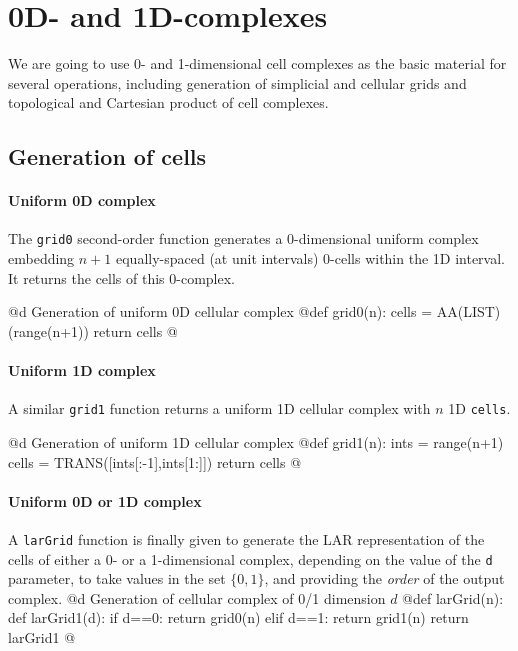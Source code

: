 \documentclass[11pt,oneside]{article}	%
\begin{document}
\section{0D- and 1D-complexes}
\label{sec:0-1-complexes}

We are going to use 0- and 1-dimensional cell complexes as the basic material for several operations, including generation of simplicial and cellular grids and topological and Cartesian product of cell complexes. 


\subsection{Generation of cells}

\paragraph{Uniform 0D complex}
The \texttt{grid0} second-order function generates a 0-dimensional uniform complex embedding $n+1$ equally-spaced (at unit intervals) 0-cells within the 1D interval. It returns the cells of this 0-complex.

@d Generation of uniform 0D cellular complex 
@{def grid0(n):
    cells = AA(LIST)(range(n+1))
    return cells
@}

\paragraph{Uniform 1D complex}
A similar \texttt{grid1} function returns a uniform 1D cellular complex with $n$ 1D \texttt{cells}.

@d Generation of uniform 1D cellular complex 
@{def grid1(n):
    ints = range(n+1)
    cells = TRANS([ints[:-1],ints[1:]])
    return cells
@}

\paragraph{Uniform 0D or 1D complex}
A \texttt{larGrid} function is finally given to generate the LAR representation of the cells of either a 0- or a 1-dimensional complex, depending on the value of the \texttt{d} parameter, to take values in the set $\{0,1\}$, and providing the \emph{order} of the output complex.
@d Generation of cellular complex of 0/1 dimension $d$
@{def larGrid(n):
    def larGrid1(d):
        if d==0: return grid0(n)
        elif d==1: return grid1(n)
    return larGrid1
@}
\end{document}
